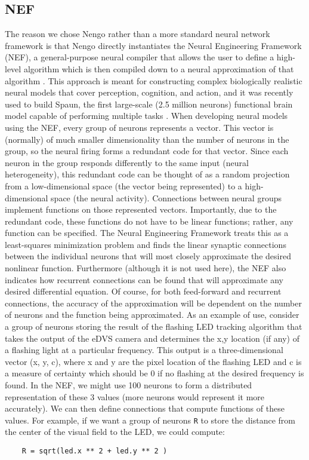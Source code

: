 \documentclass[conference]{IEEEtran}
\begin{document}
\subsection{NEF}
The reason we chose Nengo rather than a more standard neural network framework is that Nengo \cite{bekolay_nengo2014} directly instantiates the Neural Engineering Framework (NEF), a general-purpose neural compiler that allows the user to define a high-level algorithm which is then compiled down to a neural approximation of that algorithm \cite{eliasmith2004neural}. This approach is meant for constructing complex biologically realistic neural models that cover perception, cognition, and action, and it was recently used to build Spaun, the first large-scale (2.5 million neurons) functional brain model capable of performing multiple tasks  \cite{eliasmith_largescale_2012}. When developing neural models using the NEF, every group of neurons represents a vector. This vector is (normally) of much smaller dimensionality than the number of neurons in the group, so the neural firing forms a redundant code for that vector. Since each neuron in the group responds differently to the same input (neural heterogeneity), this redundant code can be thought of as a random projection from a low-dimensional space (the vector being represented) to a high-dimensional space (the neural activity). Connections between neural groups implement functions on those represented vectors. Importantly, due to the redundant code, these functions do not have to be linear functions; rather, any function can be specified. The Neural Engineering Framework treats this as a least-squares minimization problem and finds the linear synaptic connections between the individual neurons that will most closely approximate the desired nonlinear function. Furthermore (although it is not used here), the NEF also indicates how recurrent connections can be found that will approximate any desired differential equation. Of course,
for both feed-forward and recurrent connections, the accuracy of the approximation will be dependent on the number of neurons and the function being approximated. As an example of use, consider a group of neurons storing the result of the flashing LED tracking algorithm that takes the output of the eDVS camera and determines the x,y location (if any) of a flashing light at a particular frequency. This output is a three-dimensional vector (x, y, c), where x and y are the pixel location of the flashing LED and c is a measure of certainty which should be 0 if no flashing at the desired frequency is found. In the NEF, we might use 100 neurons to form a distributed representation of these 3 values (more neurons would represent it more accurately). We can then define connections that compute functions of these values. For example, if we want a group
of neurons \texttt{R} to store the distance from the center of the visual field to the LED, we could compute: 
\begin{lstlisting}
	R = sqrt(led.x ** 2 + led.y ** 2 )
\end{lstlisting}
\end{document}
